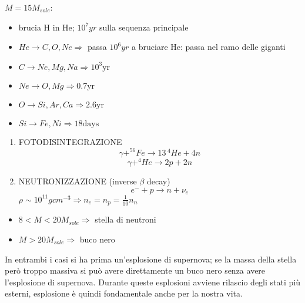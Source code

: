 \documentclass[a4paper,11pt]{report}
\theoremstyle{remark}
\theoremstyle{definition}
\begin{document}
$M = 15 M_{sole}$: 
\begin{itemize}
    \item brucia H in He;  $10^7 yr$ sulla sequenza principale
    \item $He \rightarrow C,O,Ne \Rightarrow$ passa $10^6 yr$ a bruciare He: passa nel ramo delle giganti
    \item $C \rightarrow Ne,Mg, Na \Rightarrow 10^3 \mbox{yr}$ 
    \item $Ne \rightarrow O,Mg \Rightarrow 0.7 \mbox{yr}$
    \item $O \rightarrow Si,Ar,Ca \Rightarrow 2.6 \mbox{yr}$
    \item $Si\rightarrow Fe, Ni \Rightarrow 18 \mbox{days}$
\end{itemize}
\begin{enumerate}
    \item FOTODISINTEGRAZIONE 
    \begin{equation*}
        \gamma + ^{56}Fe \rightarrow 13 \,  ^4He + 4n 
    \end{equation*}
    \begin{equation*}
        \gamma + ^4He \rightarrow 2p + 2n 
    \end{equation*}
    \item NEUTRONIZZAZIONE (inverse $\beta$ decay)
    \begin{equation*}
        e^- + p \rightarrow n + \nu_e
    \end{equation*}
    $\rho \sim 10^{11} gcm^{-3} \Rightarrow n_e=n_p = \frac{1}{10}n_n$ 
\end{enumerate}
\begin{itemize}
    \item $8 < M < 20M_{sole} \Rightarrow$ stella di neutroni
    \item $M > 20 M_{sole} \Rightarrow$ buco nero
\end{itemize}
In entrambi i casi si ha prima un'esplosione di supernova; se la massa della stella però troppo massiva si può avere direttamente un buco nero senza avere l'esplosione di supernova. Durante queste esplosioni avviene rilascio degli stati più esterni, esplosione è quindi fondamentale anche per la nostra vita.


\end{document}
